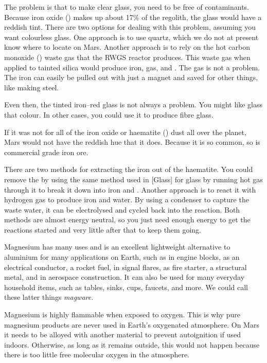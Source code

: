 The problem is that to make clear glass, you need to be free of contaminants. Because iron oxide () makes up about 17\% of the regolith, the glass would have a reddish tint. There are two options for dealing with this problem, assuming you want colourless glass. One approach is to use quartz, which we do not at present know where to locate on Mars. Another approach is to rely on the hot carbon monoxide () waste gas that the RWGS reactor produces. This waste gas when applied to tainted silica would produce iron,  gas, and . The gas is not a problem. The iron can easily be pulled out with just a magnet and saved for other things, like making steel.

Even then, the tinted iron--red glass is not always a problem. You might like glass that colour. In other cases, you could use it to produce fibre glass.

If it was not for all of the iron oxide or haematite () dust all over the planet, Mars would not have the reddish hue that it does. Because it is so common, so is commercial grade iron ore. 

There are two methods for extracting the iron out of the haematite. You could remove the  by using the same method used in [Glass] for glass by running hot  gas through it to break it down into iron and . Another approach is to react it with hydrogen gas to produce iron and water. By using a condenser to capture the waste water, it can be electrolysed and cycled back into the reaction. Both methods are almost energy neutral, so you just need enough energy to get the reactions started and very little after that to keep them going.

Magnesium has many uses and is an excellent lightweight alternative to aluminium for many applications on Earth, such as in engine blocks, as an electrical conductor, a rocket fuel, in signal flares, as fire starter, a structural metal, and in aerospace construction. It can also be used for many everyday household items, such as tables, sinks, cups, faucets, and more. We could call these latter things {\it magware}.

Magnesium is highly flammable when exposed to oxygen. This is why pure magnesium products are never used in Earth's oxygenated atmosphere. On Mars it needs to be alloyed with another material to prevent autoignition if used indoors. Otherwise, as long as it remains outside, this would not happen because there is too little free molecular oxygen in the atmosphere.

